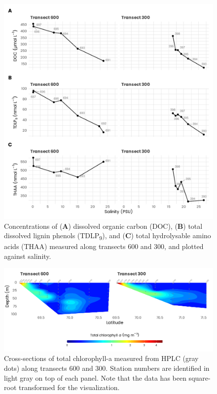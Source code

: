 \documentclass[essd, manuscript]{copernicus}
\begin{document}
\clearpage

\begin{figure}[H]
    \centering
    \includegraphics[scale = 1]{../../../graphs/fig08.pdf}
    \caption{Concentrations of (\textbf{A}) dissolved organic carbon (DOC), (\textbf{B}) total dissolved lignin phenols (TDLP\textsubscript{9}), and (\textbf{C}) total hydrolysable amino acids (THAA) measured along transects 600 and 300, and plotted against salinity.}
\end{figure}

\clearpage

\begin{figure}[H]
    \centering
    \includegraphics[scale = 1]{../../../graphs/fig09.pdf}
    \caption{Cross-sections of total chlorophyll-a measured from HPLC (gray dots) along transects 600 and 300. Station numbers are identified in light gray on top of each panel. Note that the data has been square-root transformed for the visualization.}
\end{figure}
\end{document}
